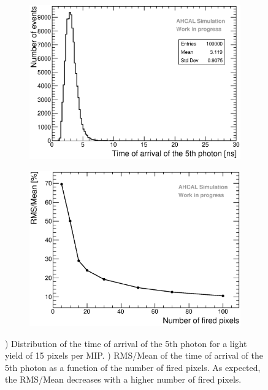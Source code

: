 \begin{figure}[htbp!]
	\begin{subfigure}[t]{0.49\textwidth}
		\centering
		\includegraphics[width=1\textwidth]{../Thesis_Plots/Timing/Muons/Plots/TimeArrival5thPhoton_MCToy.eps}
		\caption{}\label{fig:time_arrival5th}
	\end{subfigure}
	\hfill
	\begin{subfigure}[t]{0.49\textwidth}
		\centering
		\includegraphics[width=1\textwidth]{../Thesis_Plots/Timing/Muons/Plots/TimeArrival5thPhoton_MCToy_Npe.eps}
		\caption{}\label{fig:time_arrival5th_LY}
	\end{subfigure}
	\caption{) Distribution of the time of arrival of the 5th photon for a light yield of 15 pixels per MIP. ) RMS/Mean of the time of arrival of the 5th photon as a function of the number of fired pixels. As expected, the RMS/Mean decreases with a higher number of fired pixels.}
\end{figure}

